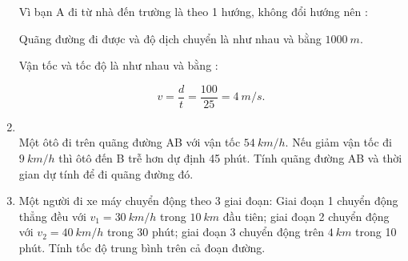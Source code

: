 \begin{enumerate}[label=\bfseries Bài \arabic*:]
{		Vì bạn A đi từ nhà đến trường là theo 1 hướng, không đổi hướng nên :
		
		Quãng đường đi được và độ dịch chuyển là như nhau và bằng $\SI{1000}{m}$.
		
		Vận tốc và tốc độ là như nhau và bằng : 
		
		$$v = \dfrac{d}{t} =\dfrac{100}{25} = \SI{4}{m/s}.$$
	}
	

	\item {}\\
	{Một ôtô đi trên quãng đường AB với vận tốc $\SI{54}{km/h}$. Nếu giảm vận tốc đi $\SI{9}{km/h}$ thì ôtô đến B trễ hơn dự định 45 phút. Tính quãng đường AB và thời gian dự tính để đi quãng đường đó.
	}
	
	\item {}
	
	{
		
		Một người đi xe máy chuyển động theo 3 giai đoạn: Giai đoạn 1 chuyển động thẳng đều với 
		$v_1 = \SI{30}{km/h}$ trong $\SI{10}{km}$ đầu tiên; giai đoạn 2 chuyển động với $v_2 = \SI{40}{km/h}$ trong 30 phút; giai đoạn 3 chuyển động trên $\SI{4}{km}$ trong 10 phút. Tính tốc độ trung bình trên cả đoạn đường.
	}
\end{enumerate}
